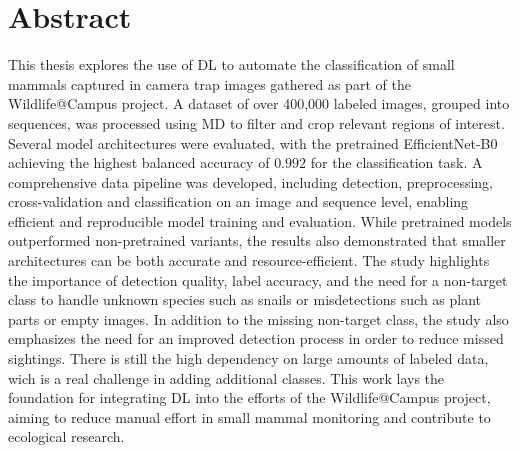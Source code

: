 

\section*{Abstract}
\label{abstract}

This thesis explores the use of \ac{DL} to automate the classification of small mammals captured in camera trap images gathered as part of the Wildlife@Campus project.
A dataset of over 400,000 labeled images, grouped into sequences, was processed using \ac{MD} to filter and crop relevant regions of interest.
Several model architectures were evaluated, with the pretrained EfficientNet-B0 achieving the highest balanced accuracy of \(0.992\) for the classification task.
A comprehensive data pipeline was developed, including detection, preprocessing, cross-validation and classification on an image and sequence level, enabling efficient and reproducible model training and evaluation.
While pretrained models outperformed non-pretrained variants, the results also demonstrated that smaller architectures can be both accurate and resource-efficient.
The study highlights the importance of detection quality, label accuracy, and the need for a non-target class to handle unknown species such as snails or misdetections such as plant parts or empty images.
In addition to the missing non-target class, the study also emphasizes the need for an improved detection process in order to reduce missed sightings.
There is still the high dependency on large amounts of labeled data, wich is a real challenge in adding additional classes.
This work lays the foundation for integrating \ac{DL} into the efforts of the Wildlife@Campus project, aiming to reduce manual effort in small mammal monitoring and contribute to ecological research.


